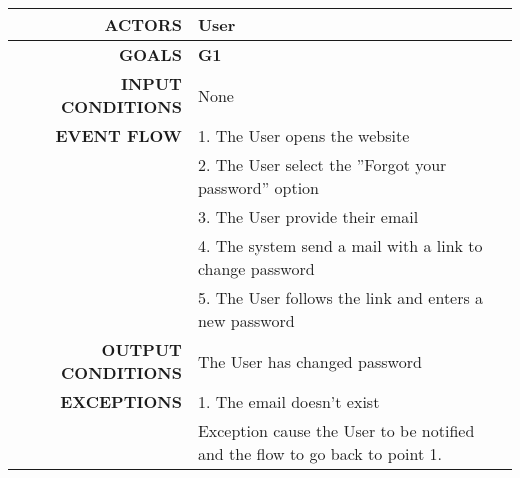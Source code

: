 \begin{table}[h!]
\begin{tabular}{|r|p{3in}|}
\hline
\textbf{ACTORS} & User\\
\hline
\textbf{GOALS} & \textbf{G1} \\
\hline
\textbf{INPUT CONDITIONS} & None \\
\hline
\textbf{EVENT FLOW} 
&1. The User opens the website \\
&2. The User select the ''Forgot your password'' option \\
&3. The User provide their email  \\
&4. The system send a mail with a link to change password\\
&5. The User follows the link and enters a new password\\
\hline
\textbf{OUTPUT CONDITIONS} & The User has changed password\\
\hline
\textbf{EXCEPTIONS} 
&1. The email doesn't exist \\
&Exception cause the User to be notified and the flow to go back to point 1.\\
\hline
\end{tabular}
\end{table}